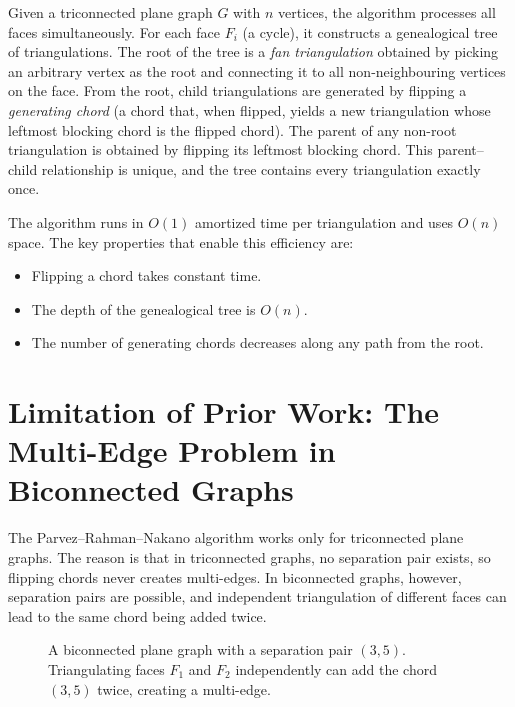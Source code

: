 Given a triconnected plane graph \(G\) with \(n\) vertices, the algorithm processes all faces simultaneously. 
For each face \(F_i\) (a cycle), it constructs a genealogical tree of triangulations. 
The root of the tree is a \emph{fan triangulation} obtained by picking an arbitrary vertex as the root and connecting it to all non-neighbouring vertices on the face. 
From the root, child triangulations are generated by flipping a \emph{generating chord} (a chord that, when flipped, yields a new triangulation whose leftmost blocking chord is the flipped chord). 
The parent of any non-root triangulation is obtained by flipping its leftmost blocking chord. 
This parent–child relationship is unique, and the tree contains every triangulation exactly once.

The algorithm runs in \(O(1)\) amortized time per triangulation and uses \(O(n)\) space. 
The key properties that enable this efficiency are:
\begin{itemize}
    \item Flipping a chord takes constant time.
    \item The depth of the genealogical tree is \(O(n)\).
    \item The number of generating chords decreases along any path from the root.
\end{itemize}

\section{Limitation of Prior Work: The Multi-Edge Problem in Biconnected Graphs}
\label{sec:limitation}

The Parvez–Rahman–Nakano algorithm works only for triconnected plane graphs. 
The reason is that in triconnected graphs, no separation pair exists, so flipping chords never creates multi-edges. 
In biconnected graphs, however, separation pairs are possible, and independent triangulation of different faces can lead to the same chord being added twice.

\begin{figure}[htbp]
    \centering
    \caption{A biconnected plane graph with a separation pair \((3,5)\). 
    Triangulating faces \(F_1\) and \(F_2\) independently can add the chord \((3,5)\) twice, creating a multi-edge.}
    \label{fig:separation_pair}
\end{figure}


